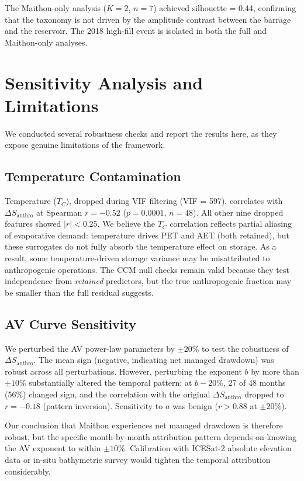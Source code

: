 \documentclass[12pt,a4paper,oneside]{report}
\newcommand{\dSanthro}{\Delta S_{\mathrm{anthro}}}
\begin{document}
The Maithon-only analysis ($K = 2$, $n = 7$) achieved silhouette = 0.44,
confirming that the taxonomy is not driven by the amplitude contrast between
the barrage and the reservoir. The 2018 high-fill event is isolated in both
the full and Maithon-only analyses.

\section{Sensitivity Analysis and Limitations}
\label{sec:results_sensitivity}

We conducted several robustness checks and report the results here,
as they expose genuine limitations of the framework.

\subsection{Temperature Contamination}

Temperature ($T_C$), dropped during VIF filtering (VIF = 597), correlates
with $\dSanthro$ at Spearman $r = -0.52$ ($p = 0.0001$, $n = 48$). All
other nine dropped features showed $|r| < 0.25$. We believe the $T_C$
correlation reflects partial aliasing of evaporative demand: temperature
drives PET and AET (both retained), but these surrogates do not fully absorb
the temperature effect on storage. As a result, some temperature-driven
storage variance may be misattributed to anthropogenic operations. The CCM
null checks remain valid because they test independence from
\textit{retained} predictors, but the true anthropogenic fraction may be
smaller than the full residual suggests.

\subsection{AV Curve Sensitivity}

We perturbed the AV power-law parameters by $\pm 20$\% to test the
robustness of $\dSanthro$. The mean sign (negative, indicating net managed
drawdown) was robust across all perturbations. However, perturbing the
exponent $b$ by more than $\pm 10$\% substantially altered the temporal
pattern: at $b - 20$\%, 27 of 48 months (56\%) changed sign, and the
correlation with the original $\dSanthro$ dropped to $r = -0.18$ (pattern
inversion). Sensitivity to $a$ was benign ($r > 0.88$ at $\pm 20$\%).

Our conclusion that Maithon experiences net managed drawdown is therefore
robust, but the specific month-by-month attribution pattern depends on
knowing the AV exponent to within $\pm 10$\%. Calibration with ICESat-2
absolute elevation data or in-situ bathymetric survey would tighten the
temporal attribution considerably.
\end{document}
